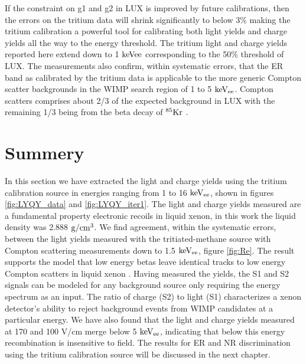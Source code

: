 If the constraint on g1 and g2 in LUX is improved by future calibrations, then the errors on the tritium data will shrink significantly to below 3\% making the tritium calibration a powerful tool for calibrating both light yields and charge yields all the way to the energy threshold. The tritium light and charge yields reported here extend down to 1 $\rm keVee$ corresponding to the 50\% threshold of LUX. The measurements also confirm, within systematic errors, that the ER band as calibrated by the tritium data is applicable to the more generic Compton scatter backgrounds in the WIMP search region of 1 to 5 $\rm keV_{ee}$. Compton scatters comprises about 2/3 of the expected background in LUX with the remaining 1/3 being from the beta decay of $\rm ^{85}Kr$ \cite{LUX_BG}.


\section{Summery}

In this section we have extracted the light and charge yields using the tritium calibration source in energies ranging from 1 to 16 $\rm keV_{ee}$, shown in figures \ref{fig:LYQY_data} and \ref{fig:LYQY_iter1}. The light and charge yields measured are a fundamental property electronic recoils in liquid xenon, in this work the liquid density was 2.888 $\rm g/cm^3$. We find agreement, within the systematic errors, between the light yields measured with the tritiated-methane source with Compton scattering measurements down to 1.5 $\rm keV_{ee}$, figure \ref{fig:Re}. The result supports the model that low energy betas leave identical tracks to low energy Compton scatters in liquid xenon \cite{NEST} \cite{NEST_2013}. Having measured the yields, the S1 and S2 signals can be modeled for any background source only requiring the energy spectrum as an input. The ratio of charge (S2) to light (S1) characterizes a xenon detector's ability to reject background events from WIMP candidates at a particular energy. We have also found that the light and charge yields measured at 170 and 100 V/cm merge below 5 $\rm keV_{ee}$, indicating that below this energy recombination is insensitive to field. The results for ER and NR discrimination using the tritium calibration source will be discussed in the next chapter.


